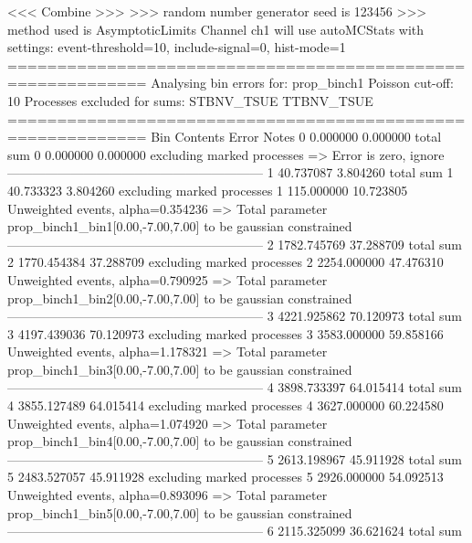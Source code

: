  <<< Combine >>> 
>>> random number generator seed is 123456
>>> method used is AsymptoticLimits
Channel ch1 will use autoMCStats with settings: event-threshold=10, include-signal=0, hist-mode=1
============================================================
Analysing bin errors for: prop_binch1
Poisson cut-off: 10
Processes excluded for sums: STBNV_TSUE TTBNV_TSUE
============================================================
Bin        Contents        Error           Notes                         
0          0.000000        0.000000        total sum                     
0          0.000000        0.000000        excluding marked processes    
  => Error is zero, ignore      
------------------------------------------------------------
1          40.737087       3.804260        total sum                     
1          40.733323       3.804260        excluding marked processes    
1          115.000000      10.723805       Unweighted events, alpha=0.354236
  => Total parameter prop_binch1_bin1[0.00,-7.00,7.00] to be gaussian constrained
------------------------------------------------------------
2          1782.745769     37.288709       total sum                     
2          1770.454384     37.288709       excluding marked processes    
2          2254.000000     47.476310       Unweighted events, alpha=0.790925
  => Total parameter prop_binch1_bin2[0.00,-7.00,7.00] to be gaussian constrained
------------------------------------------------------------
3          4221.925862     70.120973       total sum                     
3          4197.439036     70.120973       excluding marked processes    
3          3583.000000     59.858166       Unweighted events, alpha=1.178321
  => Total parameter prop_binch1_bin3[0.00,-7.00,7.00] to be gaussian constrained
------------------------------------------------------------
4          3898.733397     64.015414       total sum                     
4          3855.127489     64.015414       excluding marked processes    
4          3627.000000     60.224580       Unweighted events, alpha=1.074920
  => Total parameter prop_binch1_bin4[0.00,-7.00,7.00] to be gaussian constrained
------------------------------------------------------------
5          2613.198967     45.911928       total sum                     
5          2483.527057     45.911928       excluding marked processes    
5          2926.000000     54.092513       Unweighted events, alpha=0.893096
  => Total parameter prop_binch1_bin5[0.00,-7.00,7.00] to be gaussian constrained
------------------------------------------------------------
6          2115.325099     36.621624       total sum                     
